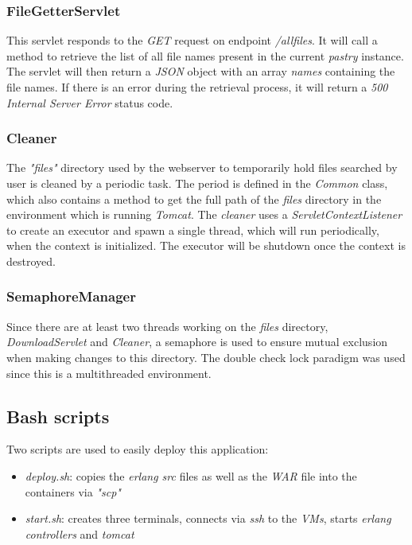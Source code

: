 \documentclass{article}
\begin{document}
\subsubsection{FileGetterServlet}
This servlet responds to the \textit{GET} request on endpoint \textit{/allfiles}. It will call a method to retrieve the list of all file names present in the current \textit{pastry} instance. The servlet will then return a \textit{JSON} object with an array \textit{names} containing the file names. If there is an error during the retrieval process, it will return a \textit{500 Internal Server Error} status code.

\subsubsection{Cleaner}
The \textit{"files"} directory used by the webserver to temporarily hold files searched by user is cleaned by a periodic task. The period is defined in the \textit{Common} class, which also contains a method to get the full path of the \textit{files} directory in the environment which is running \textit{Tomcat}.
\newline
The \textit{cleaner} uses a \textit{ServletContextListener} to create an executor and spawn a single thread, which will run periodically, when the context is initialized. The executor will be shutdown once the context is destroyed.

\subsubsection{SemaphoreManager}
Since there are at least two threads working on the \textit{files} directory, \textit{DownloadServlet} and \textit{Cleaner}, a semaphore is used to ensure mutual exclusion when making changes to this directory. The double check lock paradigm was used since this is a multithreaded environment.

\subsection{Bash scripts}
Two scripts are used to easily deploy this application:
\begin{itemize}
    \item \textit{deploy.sh}: copies the \textit{erlang src} files as well as the \textit{WAR} file into the containers via \textit{"scp"}
    \item \textit{start.sh}: creates three terminals, connects via \textit{ssh} to the \textit{VMs}, starts \textit{erlang controllers} and \textit{tomcat}
\end{itemize}
\end{document}
